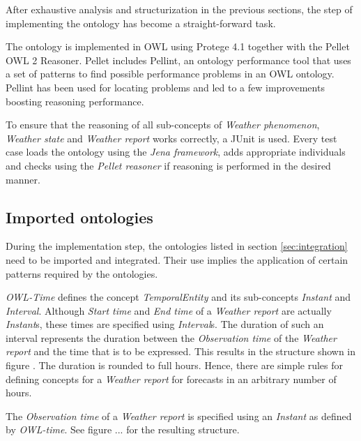 After exhaustive analysis and structurization in the previous sections, the step of implementing the ontology has become a straight-forward task.

The \thinkhomeweather ontology is implemented in OWL using Protege 4.1 together with the Pellet OWL 2 Reasoner. Pellet includes Pellint, an ontology performance tool that uses a set of patterns to find possible performance problems in an OWL ontology. Pellint has been used for locating problems and led to a few improvements boosting reasoning performance.

To ensure that the reasoning of all sub-concepts of \emph{Weather phenomenon}, \emph{Weather state} and \emph{Weather report} works correctly, a JUnit is used. Every test case loads the \thinkhomeweather ontology using the \emph{Jena framework}, adds appropriate individuals and checks using the \emph{Pellet reasoner} if reasoning is performed in the desired manner.

\subsection{Imported ontologies}

During the implementation step, the ontologies listed in section \ref{sec:integration} need to be imported and integrated. Their use implies the application of certain patterns required by the ontologies.

\emph{OWL-Time} defines the concept \emph{TemporalEntity} and its sub-concepts \emph{Instant} and \emph{Interval}. Although \emph{Start time} and \emph{End time} of a \emph{Weather report} are actually \emph{Instant}s, these times are specified using \emph{Interval}s. The duration of such an interval represents the duration between the \emph{Observation time} of the \emph{Weather report} and the time that is to be expressed. This results in the structure shown in figure . %
The duration is rounded to full hours. Hence, there are simple rules for defining concepts for a \emph{Weather report} for forecasts in an arbitrary number of hours.


The \emph{Observation time} of a \emph{Weather report} is specified using an \emph{Instant} as defined by \emph{OWL-time}. See figure ... for the resulting structure. %


